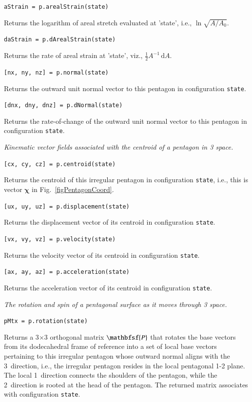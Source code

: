 \medskip\noindent
\texttt{aStrain = p.arealStrain(state)}

\medskip\noindent
Returns the logarithm of areal stretch evaluated at 'state', i.e., $\ln \sqrt{A / A_0}$.

\medskip\noindent
\texttt{daStrain = p.dArealStrain(state)}

\medskip\noindent
Returns the rate of areal strain at 'state', viz., $\tfrac{1}{2} A^{-1} \, \mathrm{d} A$.

\medskip\noindent
\texttt{[nx, ny, nz] = p.normal(state)}

\medskip\noindent
Returns the outward unit normal vector to this pentagon in configuration \texttt{state}.

\medskip\noindent
\texttt{[dnx, dny, dnz] = p.dNormal(state)}

\medskip\noindent
Returns the rate-of-change of the outward unit normal vector to this pentagon in configuration \texttt{state}.

\newpage
\medskip\noindent
\textit{Kinematic vector fields associated with the centroid of a pentagon in 3 space.}

\medskip\noindent
\texttt{[cx, cy, cz] = p.centroid(state)}

\medskip\noindent
Returns the centroid of this irregular pentagon in configuration \texttt{state}, i.e., this is vector $\boldsymbol{\chi}$ in Fig.~\ref{figPentagonCoord}.

\medskip\noindent
\texttt{[ux, uy, uz] = p.displacement(state)}

\medskip\noindent
Returns the displacement vector of its centroid in configuration \texttt{state}.

\medskip\noindent
\texttt{[vx, vy, vz] = p.velocity(state)}

\medskip\noindent
Returns the velocity vector of its centroid in configuration \texttt{state}.

\medskip\noindent
\texttt{[ax, ay, az] = p.acceleration(state)}

\medskip\noindent
Returns the acceleration vector of its centroid in configuration \texttt{state}.

\medskip\noindent
\textit{The rotation and spin of a pentagonal surface as it moves through 3 space.}

\medskip\noindent
\texttt{pMtx = p.rotation(state)}

\medskip\noindent
Returns a 3$\times$3 orthogonal matrix $\mathbfsf{P}$ that rotates the base vectors from its dodecahedral frame of reference into a set of local base vectors pertaining to this irregular pentagon whose outward normal aligns with the 3~direction, i.e., the irregular pentagon resides in the local pentagonal 1-2 plane.  The local 1~direction connects the shoulders of the pentagon, while the 2~direction is rooted at the head of the pentagon.  The returned matrix associates with configuration \texttt{state}.

